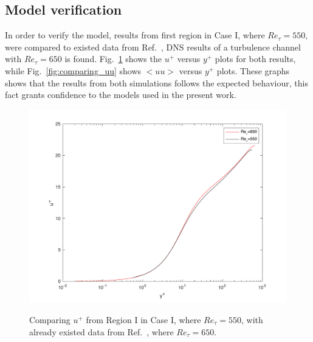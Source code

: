 \documentclass[twocolumn,10pt]{asme2e}
\begin{document}
\subsection*{Model verification}

In order to verify the model, results from first region in Case I, where \(Re_{\tau}=550\), were compared to existed data from Ref.~\cite{iwamoto2002}, DNS results of a turbulence channel with \(Re_{\tau}=650\) is found. Fig.~\ref{fig:comparing_u} shows the \(u^+\) versus \(y^+\) plots for both results, while Fig.~\ref{fig:comparing_uu} shows \(<uu>\) versus \(y^+\) plots. These graphs shows that the results from both simulations follows the expected behaviour, this fact grants confidence to the models used in the present work.

\begin{figure}[t]
\centering
\scalebox{0.5}
{\includegraphics{comparing_u.pdf}}
\caption{Comparing \(u^+\) from Region I in Case I, where \(Re_{\tau}=550\), with already existed data from Ref.~\cite{iwamoto2002}, where \(Re_{\tau}=650\).}
\label{fig:comparing_u}
\end{figure}
\end{document}
